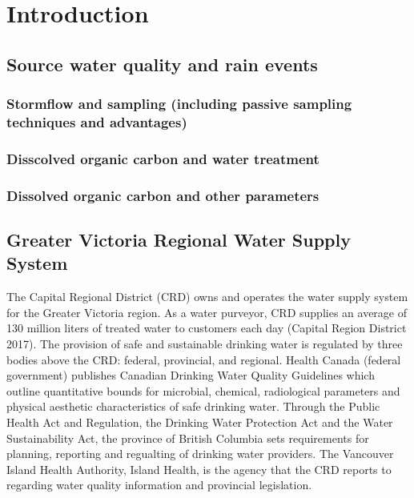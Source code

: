 \documentclass[]{article}
\begin{document}
\section{Introduction}\label{introduction}

\subsection{Source water quality and rain
events}\label{source-water-quality-and-rain-events}

\subsubsection{Stormflow and sampling (including passive sampling
techniques and
advantages)}\label{stormflow-and-sampling-including-passive-sampling-techniques-and-advantages}

\subsubsection{Disscolved organic carbon and water
treatment}\label{disscolved-organic-carbon-and-water-treatment}

\subsubsection{Dissolved organic carbon and other
parameters}\label{dissolved-organic-carbon-and-other-parameters}

\subsection{Greater Victoria Regional Water Supply
System}\label{greater-victoria-regional-water-supply-system}

The Capital Regional District (CRD) owns and operates the water supply
system for the Greater Victoria region. As a water purveyor, CRD
supplies an average of 130 million liters of treated water to customers
each day (Capital Region District 2017). The provision of safe and
sustainable drinking water is regulated by three bodies above the CRD:
federal, provincial, and regional. Health Canada (federal government)
publishes Canadian Drinking Water Quality Guidelines which outline
quantitative bounds for microbial, chemical, radiological parameters and
physical aesthetic characteristics of safe drinking water. Through the
Public Health Act and Regulation, the Drinking Water Protection Act and
the Water Sustainability Act, the province of British Columbia sets
requirements for planning, reporting and regualting of drinking water
providers. The Vancouver Island Health Authority, Island Health, is the
agency that the CRD reports to regarding water quality information and
provincial legislation.
\end{document}
